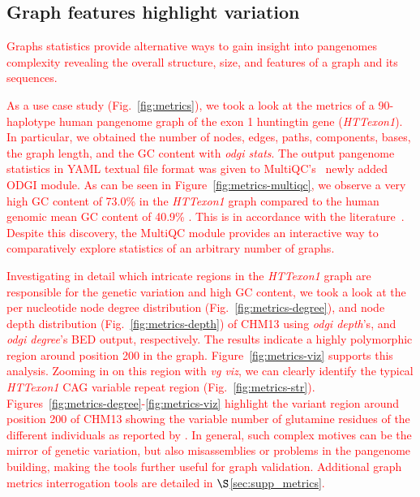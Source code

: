 \documentclass{bioinfo}
\newcommand{\REVIEWED}[1]{{\textcolor{Red}{#1}}}
\begin{document}


\subsection{Graph features highlight variation}
\label{sec:metrics}

\REVIEWED{Graphs statistics provide alternative ways to gain insight into pangenomes complexity revealing the overall structure, size, and features of a graph and its sequences.}

\REVIEWED{As a use case study (Fig.~\ref{fig:metrics}), we took a look at the metrics of a 90-haplotype human pangenome graph of the exon 1 huntingtin gene (\textit{HTTexon1}). In particular, we obtained the number of nodes, edges, paths, components, bases, the graph length, and the GC content with \textit{odgi stats}. The output pangenome statistics in YAML textual file format was given to
MultiQC's~\citep{Ewels_2016} newly added ODGI module. As can be seen in Figure~\ref{fig:metrics-multiqc}, we observe a very high GC content of 73.0\% in the \textit{HTTexon1} graph compared to the human genomic mean GC content of 40.9\% \citep{Piovesan2019}. This is in accordance with the literature~\citep{Neueder2017}. %
Despite this discovery, the MultiQC module provides an interactive way to comparatively explore statistics of an arbitrary number of graphs.}

\REVIEWED{Investigating in detail which intricate regions in the \textit{HTTexon1} graph are responsible for the genetic variation and high GC content, we took a look at the per nucleotide node degree distribution (Fig.~\ref{fig:metrics-degree}), and node depth distribution (Fig.~\ref{fig:metrics-depth}) of CHM13 using \textit{odgi depth}'s, and \textit{odgi degree}'s BED output, respectively. The results indicate a highly polymorphic region around position 200 in the graph. Figure~\ref{fig:metrics-viz} supports this analysis. Zooming in on this region with \textit{vg viz}, we can clearly identify the typical \textit{HTTexon1} CAG variable repeat region (Fig.~\ref{fig:metrics-str}).
Figures~\ref{fig:metrics-degree}-\ref{fig:metrics-viz} highlight the variant region around position 200 of CHM13 showing the variable number of glutamine residues of the different individuals as reported by \citep{Nance1999}.
In general, such complex motives can be the mirror of genetic variation, but also misassemblies or problems in the pangenome building, making the tools further useful for graph validation. Additional graph metrics interrogation tools are detailed in $\S$\ref{sec:supp_metrics}.}
\end{document}
